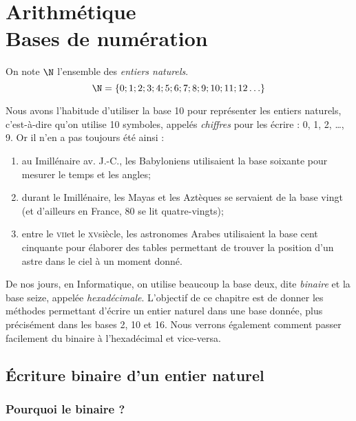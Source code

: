 \documentclass[a4paper,12pt,french]{book}
\begin{document}
\setcounter{chapter}{0}


\chapter{\large Arithmétique\\[-1em]\fontsize{35pt}{42pt}\selectfont\titlefont Bases de numération}
 
\begin{definition}
On note $\N$ l'ensemble des \textit{entiers naturels}. $$\N=\lbrace 0;1;2;3;4;5;6;7;8;9;10;11;12\ldots\}$$
\end{definition}

Nous avons l'habitude d'utiliser la base 10 pour représenter les entiers naturels, c'est-à-dire qu'on utilise 10 symboles, appelés \textit{chiffres} 
pour les écrire : 0, 1, 2, \ldots, 9.
Or il n'en a pas toujours été ainsi : 
\begin{enumerate}[--]
	\item 	au \textsc{I}\er millénaire av. J.-C., les Babyloniens utilisaient la base soixante pour mesurer le temps et les angles;
	\item 	durant le \textsc{I}\er millénaire, les Mayas et les Aztèques se servaient de la base vingt (et d'ailleurs en France, 80 se lit \og 
	quatre-vingts\fg);
	\item 	entre le \textsc{vii}\eme et le \textsc{xv}\eme siècle, les astronomes Arabes utilisaient la base cent cinquante pour élaborer des tables 
	permettant de trouver la position d'un astre dans le ciel à un moment donné.
\end{enumerate}
De nos jours, en Informatique, on utilise beaucoup la base deux, dite \textit{binaire} et la base seize, appelée \textit{hexadécimale}.
L'objectif de ce chapitre est de donner les méthodes permettant d'écrire un entier naturel dans une base donnée, plus précisément dans les bases 2, 
10 et 16. Nous verrons également comment passer facilement du binaire à l'hexadécimal et vice-versa.

\section{\'Ecriture binaire d'un entier naturel}
\subsection{Pourquoi le binaire ?}
\end{document}

